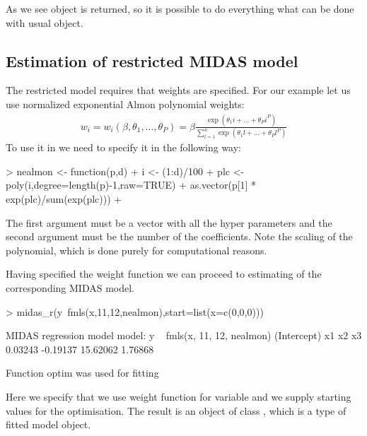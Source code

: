 \documentclass[nojss]{jss}
\begin{document}
As we see  object is returned, so it is possible to do
everything what can be done with usual  object.

\subsection{Estimation of restricted MIDAS model}
The restricted model requires that weights are specified. For our
example let us use normalized exponential Almon polynomial weights:
\begin{align*}
  w_i=w_i(\beta,\theta_1,...,\theta_P)=\beta\frac{\exp(\theta_1i+...+\theta_Pi^P)}{\sum_{l=1}^n\exp(\theta_1l+...+\theta_Pl^P)}
\end{align*}
To use it in  we need to specify it in the following way:
\begin{Schunk}
\begin{Sinput}
> nealmon <- function(p,d) {
+   i <- (1:d)/100
+   plc <- poly(i,degree=length(p)-1,raw=TRUE) %*% p[-1]
+   as.vector(p[1] * exp(plc)/sum(exp(plc)))
+ }
\end{Sinput}
\end{Schunk}
The first argument must be a vector with all the hyper parameters and
the second argument must be the number of the coefficients. Note the
scaling of the polynomial, which is done purely for computational reasons.

Having specified the weight function we can proceed to estimating
of the corresponding MIDAS model. 

\begin{Schunk}
\begin{Sinput}
> midas_r(y~fmls(x,11,12,nealmon),start=list(x=c(0,0,0)))
\end{Sinput}
\begin{Soutput}
MIDAS regression model
 model: y ~ fmls(x, 11, 12, nealmon) 
(Intercept)          x1          x2          x3 
    0.03243    -0.19137    15.62062     1.76868 

Function optim was used for fitting
\end{Soutput}
\end{Schunk}

Here we specify that we use weight function  for
variable  and we supply starting values for the
optimisation. The result is an object of class , which
is a type of fitted model object. 






\end{document}
